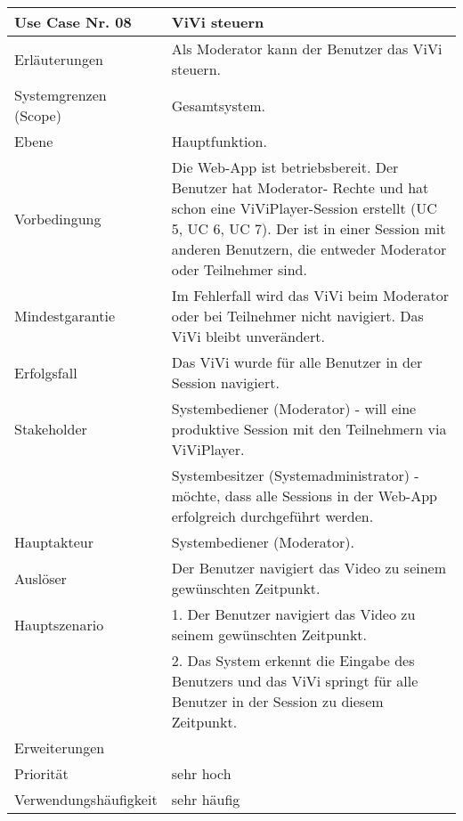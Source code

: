 \begin{tabularx}{\linewidth}{|l|X|}
	\hline
	Use Case Nr. 08			& \textbf{ViVi steuern} \\ \hline
	Erläuterungen			& Als Moderator kann der Benutzer das ViVi steuern. \\ \hline
	Systemgrenzen (Scope)	& Gesamtsystem. \\ \hline
	Ebene					& Hauptfunktion. \\ \hline
	Vorbedingung			& Die Web-App ist betriebsbereit. Der Benutzer hat Moderator-
							  Rechte und hat schon eine ViViPlayer-Session erstellt (UC 5, UC 6, UC 7). Der ist in einer Session mit anderen Benutzern, die entweder Moderator oder Teilnehmer sind. \\ \hline
	Mindestgarantie			& Im Fehlerfall wird das ViVi beim Moderator oder bei Teilnehmer 
							  nicht navigiert. Das ViVi bleibt unverändert. \\ \hline
	Erfolgsfall 			& Das ViVi wurde für alle Benutzer in der Session navigiert. 
							  \\ \hline
	Stakeholder				& Systembediener (Moderator) - will eine produktive Session mit den 
							  Teilnehmern via ViViPlayer. \\
							& Systembesitzer (Systemadministrator) - möchte, dass alle Sessions in der
							  Web-App erfolgreich durchgeführt werden. \\ \hline
	Hauptakteur				& Systembediener (Moderator). \\ \hline
	Auslöser				& Der Benutzer navigiert das Video zu seinem gewünschten 
							  Zeitpunkt. \\ \hline	
	Hauptszenario			& 1. Der Benutzer navigiert das Video zu seinem gewünschten
							  Zeitpunkt. \\
							& 2. Das System erkennt die Eingabe des Benutzers und
							  das ViVi springt für alle Benutzer in der Session zu diesem Zeitpunkt.
							  \\ \hline
	Erweiterungen			&  \\ \hline
	Priorität				& sehr hoch \\ \hline
	Verwendungshäufigkeit	& sehr häufig \\ \hline
\end{tabularx}